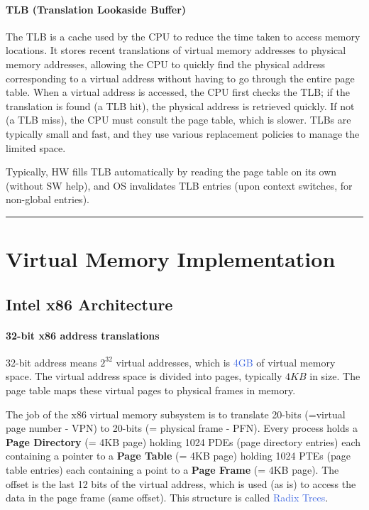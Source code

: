 \documentclass[openany,12pt]{book}
\newcommand{\blue}[1]{\textcolor{RoyalBlue}{#1}}
\begin{document}
\paragraph{TLB (Translation Lookaside Buffer)} The TLB is a cache used by the CPU to reduce the time taken to access memory locations. It stores recent translations of virtual memory addresses to physical memory addresses, allowing the CPU to quickly find the physical address corresponding to a virtual address without having to go through the entire page table. When a virtual address is accessed, the CPU first checks the TLB; if the translation is found (a TLB hit), the physical address is retrieved quickly. If not (a TLB miss), the CPU must consult the page table, which is slower. TLBs are typically small and fast, and they use various replacement policies to manage the limited space. 

Typically, HW fills TLB automatically by reading the page table on its own (without SW help), and OS invalidates TLB entries (upon context switches, for non-global entries).





\noindent\rule{\linewidth}{0.4pt}


\section*{Virtual Memory Implementation}

\subsection*{Intel x86 Architecture}

\paragraph{32-bit x86 address translations} 32-bit address means \(2^{32}\) virtual addresses, which is \blue{4GB} of virtual memory space. The virtual address space is divided into pages, typically \(4KB\) in size. The page table maps these virtual pages to physical frames in memory.

\vspace*{0.5em} 

The job of the x86 virtual memory subsystem is to translate 20-bits (=virtual page number - VPN) to 20-bits (= physical frame - PFN). Every process holds a \textbf{Page Directory} (= 4KB page) holding 1024 PDEs (page directory entries) each containing a pointer to a \textbf{Page Table} (= 4KB page) holding 1024 PTEs (page table entries) each containing a point to a \textbf{Page Frame} (= 4KB page). The offset is the last 12 bits of the virtual address, which is used (as is) to access the data in the page frame (same offset). This structure is called \blue{Radix Trees}.
\end{document}
